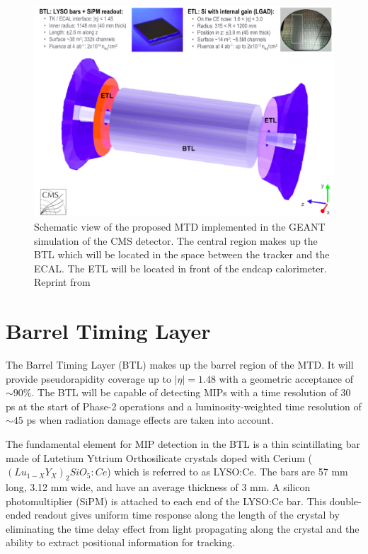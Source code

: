 \begin{figure}[h]
	\centering
	\includegraphics[width=1.0\linewidth]{Figures/MTD_overview}
	\caption[Schematic view of MTD]{Schematic view of the proposed MTD implemented in the GEANT simulation of the CMS detector. The central region makes up the BTL which will be located in the space between the tracker and the ECAL. The ETL will be located in front of the endcap calorimeter. Reprint from }
	\label{fig:mtdoverview}
\end{figure}




\section{Barrel Timing Layer}
 The Barrel Timing Layer (BTL) makes up the barrel region of the MTD.  It will provide pseudorapidity coverage up to $|\eta| = 1.48$ with a geometric acceptance of $\sim 90\%$.  The BTL will be capable of detecting MIPs with a time resolution of 30 ps at the start of Phase-2 operations and a luminosity-weighted time resolution of $\sim45$ ps when radiation damage effects are taken into account.     
 
 The fundamental element for MIP detection in the BTL is a thin scintillating bar made of Lutetium Yttrium Orthosilicate crystals doped with Cerium ($(Lu_{1-X}Y_X)_2SiO_5:Ce$) which is referred to as LYSO:Ce.  The bars are 57 mm long, 3.12 mm wide, and have an average thickness of 3 mm.  A silicon photomultiplier (SiPM) is attached to each end of the LYSO:Ce bar.  This double-ended readout gives uniform time response along the length of the crystal by eliminating the time delay effect from light propagating along the crystal and the ability to extract positional information for tracking. 
 
